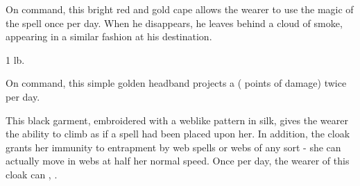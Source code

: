 \begin{comment}
Bracers of Armor: These items appear to be wrist or arm guards. They surround the wearer with an invisible but tangible field of force, granting him an armor bonus of \plus1 to \plus8, just as though he were wearing armor. Both bracers must be worn for the magic to be effective.

Moderate conjuration; CL 7th; Craft Wondrous Item, mage armor, creator's caster level must be at least two times that of the bonus placed in the bracers; Price 1,000 gp (\plus1), 4,000 gp (\plus2), 9,000 gp (\plus3), 16,000 gp (\plus4), 25,000 gp (\plus5), 36,000 gp (\plus6), 49,000 gp (\plus7), 64,000 gp (\plus8);Weight 1 lb.
\end{comment}

 On command, this bright red and gold cape allows the wearer to use the magic of the  spell once per day. When he disappears, he leaves behind a cloud of smoke, appearing in a similar fashion at his destination.

 1 lb.

 On command, this simple golden headband projects a  ( points of  damage) twice per day.

\begin{comment}
\itemdescription{Circlet of Blasting, Major}{25,000}{14th}{Head}{12th}{Strong evocation} On command, this elaborate golden headband projects a \my{\spell{scorching ray}} (\my{10d6 \x 1.5} points of \my{fire} damage) once per day.
\prereq{Craft Wondrous Item, \my{Empower} Spell, \my{scorching ray}}
\end{comment}

 This black garment, embroidered with a weblike pattern in silk, gives the wearer the ability to climb as if a  spell had been placed upon her. In addition, the cloak grants her immunity to entrapment by web spells or webs of any sort - she can actually move in webs at half her normal speed. Once per day, the wearer of this cloak can  , .

